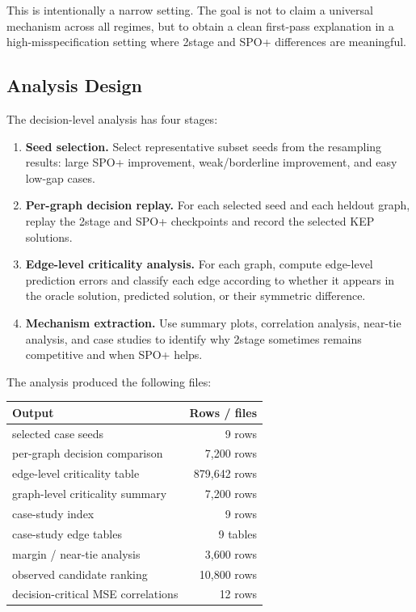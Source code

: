 \documentclass[11pt]{article}
\begin{document}
This is intentionally a narrow setting. The goal is not to claim a universal
mechanism across all regimes, but to obtain a clean first-pass explanation in a
high-misspecification setting where 2stage and SPO+ differences are meaningful.

\subsection{Analysis Design}
The decision-level analysis has four stages:

\begin{enumerate}
    \item \textbf{Seed selection.} Select representative subset seeds from the
    resampling results: large SPO+ improvement, weak/borderline improvement,
    and easy low-gap cases.

    \item \textbf{Per-graph decision replay.} For each selected seed and each
    heldout graph, replay the 2stage and SPO+ checkpoints and record the
    selected KEP solutions.

    \item \textbf{Edge-level criticality analysis.} For each graph, compute
    edge-level prediction errors and classify each edge according to whether it
    appears in the oracle solution, predicted solution, or their symmetric
    difference.

    \item \textbf{Mechanism extraction.} Use summary plots, correlation
    analysis, near-tie analysis, and case studies to identify why 2stage
    sometimes remains competitive and when SPO+ helps.
\end{enumerate}

The analysis produced the following files:

\begin{center}
\small
\begin{tabular}{lr}
\toprule
Output & Rows / files \\
\midrule
selected case seeds & 9 rows \\
per-graph decision comparison & 7,200 rows \\
edge-level criticality table & 879,642 rows \\
graph-level criticality summary & 7,200 rows \\
case-study index & 9 rows \\
case-study edge tables & 9 tables \\
margin / near-tie analysis & 3,600 rows \\
observed candidate ranking & 10,800 rows \\
decision-critical MSE correlations & 12 rows \\
\bottomrule
\end{tabular}
\end{center}
\end{document}
